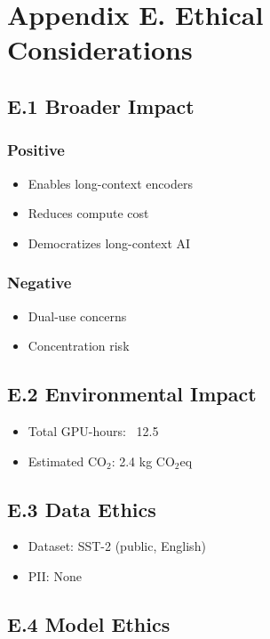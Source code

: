 
\section{Appendix E. Ethical Considerations}

\subsection{E.1 Broader Impact}

\subsubsection{Positive}
\begin{itemize}
\item Enables long-context encoders
\item Reduces compute cost
\item Democratizes long-context AI

\end{itemize}
\subsubsection{Negative}
\begin{itemize}
\item Dual-use concerns
\item Concentration risk

\end{itemize}
\subsection{E.2 Environmental Impact}

\begin{itemize}
\item Total GPU-hours: ~12.5
\item Estimated CO$_2$: 2.4 kg CO$_2$eq

\end{itemize}
\subsection{E.3 Data Ethics}

\begin{itemize}
\item Dataset: SST-2 (public, English)
\item PII: None

\end{itemize}
\subsection{E.4 Model Ethics}

